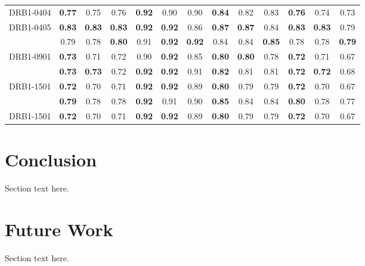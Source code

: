\documentclass[conference,10pt,draftclsnofoot,onecolumn]{IEEEtran}
\begin{document}
\begin{table}[!t]
\begin{tabular}{|c|c|c|c|c|c|c|c|c|c|c|c|c|}
\multirow{1}{*}{DRB1-0404}  & \bf 0.77 & 0.75 & 0.76 & \bf 0.92 & 0.90 & 0.90 & \bf 0.84 & 0.82 & 0.83 & \bf 0.76 & 0.74 & 0.73\\
\cline{2-13}
DRB1-0405 & \bf 0.83 & \bf 0.83 & \bf 0.83 & \bf 0.92 & \bf 0.92 & 0.86 & \bf 0.87 & \bf 0.87 & 0.84 & \bf 0.83 & \bf 0.83 & 0.79\\
\hhline{=============}

\multirow{1}{*}{DRB1-0701} & 0.79 & 0.78 & \bf 0.80 & 0.91 & \bf 0.92 & \bf 0.92 & 0.84 & 0.84 & \bf 0.85 & 0.78 & 0.78 & \bf0.79\\
\cline{2-13}
DRB1-0901 & \bf 0.73 & 0.71 & 0.72 & 0.90 & \bf 0.92 & 0.85 & \bf 0.80 & \bf 0.80 & 0.78 & \bf 0.72 & 0.71 & 0.67\\
\hhline{=============}

\multirow{1}{*}{DRB1-0401} & \bf 0.73 & \bf 0.73 & 0.72 & \bf 0.92 & \bf 0.92 & 0.91 & \bf 0.82 & 0.81 & 0.81 & \bf 0.72 & \bf 0.72 & 0.68\\
\cline{2-13}
DRB1-1501 & \bf 0.72 & 0.70 & 0.71 & \bf 0.92 & \bf 0.92 & 0.89 & \bf 0.80 & 0.79 & 0.79 & \bf 0.72 & 0.70 & 0.67\\
\hhline{=============}

\multirow{1}{*}{DRB1-1101} & \bf 0.79 & 0.78 & 0.78 & \bf 0.92 & 0.91 & 0.90 & \bf 0.85 & 0.84 & 0.84 & \bf 0.80 & 0.78 & 0.77\\
\cline{2-13}
DRB1-1501 & \bf 0.72 & 0.70 & 0.71 & \bf 0.92 & \bf 0.92 & 0.89 & \bf 0.80 & 0.79 & 0.79 & \bf 0.72 & 0.70 & 0.67\\
\hline
\end{tabular}
\end{table}


\section{Conclusion}
\label{sec:conclusion}
Section text here.

\section{Future Work}
\label{sec:futureWork}
Section text here.
\end{document}
